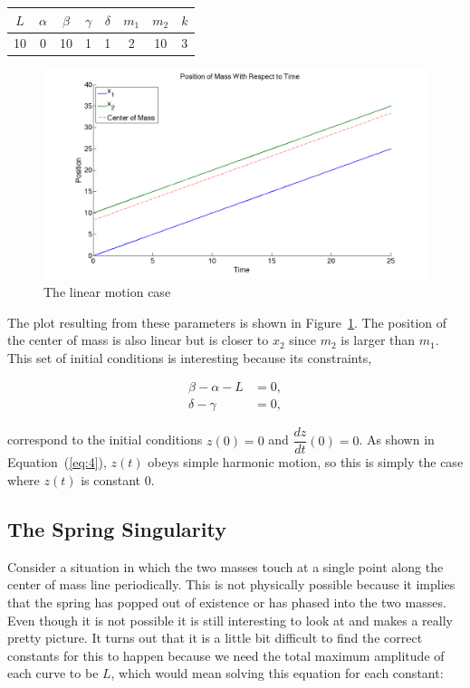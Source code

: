 \documentclass[11pt, oneside]{article}   	%
\begin{document}
\begin{center}

\begin{tabular}{| c | c | c | c | c | c | c | c |}

\hline

$L$ & $\alpha$ & $\beta$ & $\gamma$ & $\delta$ & $m_1$ & $m_2$ & $k$ \\

\hline

 10 & 0 & 10 & 1 & 1 & 2 & 10 & 3\\

\hline

\end{tabular}

\end{center}

\begin{figure}[h!]
\centering \includegraphics[scale=0.3]{sanity2}
\caption{\label{sanity2} The linear motion case}
\end{figure}

The plot resulting from these parameters is shown in Figure~\ref{sanity2}.
The position of the center of mass is also linear but is closer to $x_2$ since $m_2$ is larger than $m_1$.
This set of initial conditions is interesting because its constraints,

\begin{align*}
\beta - \alpha - L &= 0,\\
\delta - \gamma &= 0,
\end{align*}

correspond to the initial conditions $z(0)=0$ and $\dfrac{dz}{dt}(0) = 0$.
As shown in Equation~(\ref{eq:4}), $z(t)$ obeys simple harmonic motion, so this is simply the case where $z(t)$ is constant 0.

\subsection{The Spring Singularity}
Consider a situation in which the two masses touch at a single point along the center of mass line periodically.
This is not physically possible because it implies that the spring has popped out of existence or has phased into the two masses.
Even though it is not possible it is still interesting to look at and makes a really pretty picture.
It turns out that it is a little bit difficult to find the correct constants for this to happen because we need the total maximum amplitude of each curve to be $L$, which would mean solving this equation for each constant:
\end{document}

